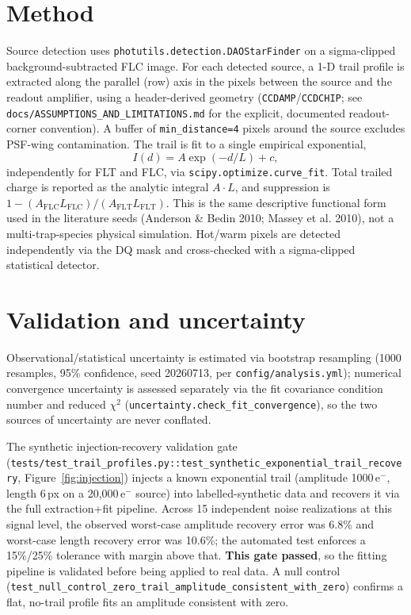 \documentclass[11pt]{article}
\begin{document}
\section{Method}
Source detection uses \texttt{photutils.detection.DAOStarFinder} on a
sigma-clipped background-subtracted FLC image. For each detected source, a
1-D trail profile is extracted along the parallel (row) axis in the pixels
between the source and the readout amplifier, using a header-derived
geometry (\texttt{CCDAMP}/\texttt{CCDCHIP}; see
\texttt{docs/ASSUMPTIONS\_AND\_LIMITATIONS.md} for the explicit, documented
readout-corner convention). A buffer of \texttt{min\_distance=4} pixels
around the source excludes PSF-wing contamination. The trail is fit to a
single empirical exponential,
\[
  I(d) = A \exp(-d / L) + c,
\]
independently for FLT and FLC, via \texttt{scipy.optimize.curve\_fit}. Total
trailed charge is reported as the analytic integral $A \cdot L$, and
suppression is $1 - (A_{\mathrm{FLC}} L_{\mathrm{FLC}}) / (A_{\mathrm{FLT}}
L_{\mathrm{FLT}})$. This is the same descriptive functional form used in the
literature seeds (Anderson \& Bedin 2010; Massey et al. 2010), not a
multi-trap-species physical simulation. Hot/warm pixels are detected
independently via the DQ mask and cross-checked with a sigma-clipped
statistical detector.

\section{Validation and uncertainty}
\label{sec:validation}
Observational/statistical uncertainty is estimated via bootstrap resampling
(1000 resamples, 95\% confidence, seed 20260713, per
\texttt{config/analysis.yml}); numerical convergence uncertainty is assessed
separately via the fit covariance condition number and reduced
$\chi^2$ (\texttt{uncertainty.check\_fit\_convergence}), so the two sources
of uncertainty are never conflated.

The synthetic injection-recovery validation gate
(\texttt{tests/test\_trail\_profiles.py::test\_synthetic\_exponential\_trail\_recovery},
Figure~\ref{fig:injection}) injects a known exponential trail
(amplitude 1000\,e$^-$, length 6\,px on a 20{,}000\,e$^-$ source) into
labelled-synthetic data and recovers it via the full extraction+fit pipeline.
Across 15 independent noise realizations at this signal level, the observed
worst-case amplitude recovery error was 6.8\% and worst-case length recovery
error was 10.6\%; the automated test enforces a 15\%/25\% tolerance with
margin above that. \textbf{This gate passed}, so the fitting pipeline is
validated before being applied to real data. A null control
(\texttt{test\_null\_control\_zero\_trail\_amplitude\_consistent\_with\_zero})
confirms a flat, no-trail profile fits an amplitude consistent with zero.
\end{document}
